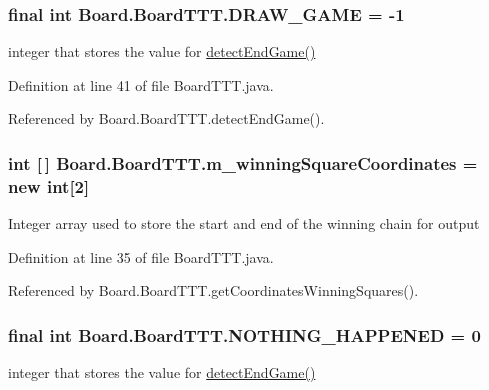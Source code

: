 \subsubsection[{D\+R\+A\+W\+\_\+\+G\+A\+M\+E}]{\setlength{\rightskip}{0pt plus 5cm}final int Board.\+Board\+T\+T\+T.\+D\+R\+A\+W\+\_\+\+G\+A\+M\+E = -\/1\hspace{0.3cm}{\ttfamily [static]}}\label{class_board_1_1_board_t_t_t_a16be9cbe57d43388a3fa6e5b706210e5}
integer that stores the value for \hyperlink{class_board_1_1_board_t_t_t_a08f36da4210111d8f129be28a550334e}{detect\+End\+Game()} 

Definition at line 41 of file Board\+T\+T\+T.\+java.



Referenced by Board.\+Board\+T\+T\+T.\+detect\+End\+Game().

\hypertarget{class_board_1_1_board_t_t_t_a50bc789f0168c29495d4827cca10c89f}{}
\subsubsection[{m\+\_\+winning\+Square\+Coordinates}]{\setlength{\rightskip}{0pt plus 5cm}int \mbox{[}$\,$\mbox{]} Board.\+Board\+T\+T\+T.\+m\+\_\+winning\+Square\+Coordinates = new int\mbox{[}2\mbox{]}\hspace{0.3cm}{\ttfamily [private]}}\label{class_board_1_1_board_t_t_t_a50bc789f0168c29495d4827cca10c89f}
Integer array used to store the start and end of the winning chain for output 

Definition at line 35 of file Board\+T\+T\+T.\+java.



Referenced by Board.\+Board\+T\+T\+T.\+get\+Coordinates\+Winning\+Squares().

\hypertarget{class_board_1_1_board_t_t_t_a5448324216e6a32d3264e50779962562}{}
\subsubsection[{N\+O\+T\+H\+I\+N\+G\+\_\+\+H\+A\+P\+P\+E\+N\+E\+D}]{\setlength{\rightskip}{0pt plus 5cm}final int Board.\+Board\+T\+T\+T.\+N\+O\+T\+H\+I\+N\+G\+\_\+\+H\+A\+P\+P\+E\+N\+E\+D = 0\hspace{0.3cm}{\ttfamily [static]}}\label{class_board_1_1_board_t_t_t_a5448324216e6a32d3264e50779962562}
integer that stores the value for \hyperlink{class_board_1_1_board_t_t_t_a08f36da4210111d8f129be28a550334e}{detect\+End\+Game()} 

